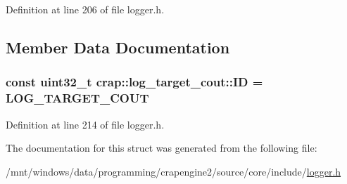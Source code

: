 Definition at line 206 of file logger.\+h.



\subsection{Member Data Documentation}
\hypertarget{structcrap_1_1log__target__cout_a28042ea81a3466c87184a2c6c6cb2b02}{
\subsubsection[{I\+D}]{\setlength{\rightskip}{0pt plus 5cm}const uint32\+\_\+t crap\+::log\+\_\+target\+\_\+cout\+::\+I\+D = {\bf L\+O\+G\+\_\+\+T\+A\+R\+G\+E\+T\+\_\+\+C\+O\+U\+T}\hspace{0.3cm}{\ttfamily [static]}}}\label{structcrap_1_1log__target__cout_a28042ea81a3466c87184a2c6c6cb2b02}


Definition at line 214 of file logger.\+h.



The documentation for this struct was generated from the following file\+:\begin{DoxyCompactItemize}
\item 
/mnt/windows/data/programming/crapengine2/source/core/include/\hyperlink{logger_8h}{logger.\+h}\end{DoxyCompactItemize}
